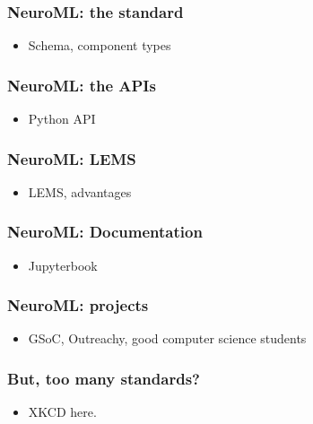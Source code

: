 \begin{frame}[c]
  \frametitle{NeuroML: the standard}
  \begin{itemize}
    \item Schema, component types
  \end{itemize}
\end{frame}
\begin{frame}[c]
  \frametitle{NeuroML: the APIs}
  \begin{itemize}
    \item Python API
  \end{itemize}
\end{frame}
\begin{frame}[c]
  \frametitle{NeuroML: LEMS}
  \begin{itemize}
    \item LEMS, advantages
  \end{itemize}
\end{frame}
\begin{frame}[c]
  \frametitle{NeuroML: Documentation}
  \begin{itemize}
    \item Jupyterbook
  \end{itemize}
\end{frame}
\begin{frame}[c]
  \frametitle{NeuroML: projects}
  \begin{itemize}
    \item GSoC, Outreachy, good computer science students
  \end{itemize}
\end{frame}
\begin{frame}[c]
  \frametitle{But, too many standards?}
  \begin{itemize}
    \item XKCD here.
  \end{itemize}
\end{frame}

